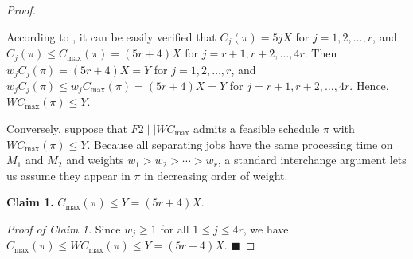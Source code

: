 \documentclass[12pt]{article}
\renewcommand{\thefigure}{\arabic{figure}}
\begin{document}
\begin{sloppypar}
\begin{proof}
\begin{figure}[H]
                \label{fig:nphard-3-partition}
            \end{figure}   
            
            According to , it can be easily verified that $C_j(\pi)=5jX$ for $j=1, 2, \ldots, r$, and $C_j(\pi) \leq C_{\max}(\pi)=(5r+4)X$ for $j=r+1, r+2, \ldots, 4r$. Then $w_j C_j(\pi)=(5r+4)X=Y$ for $j=1, 2, \ldots, r$, and $w_j C_j(\pi) \leq w_j C_{\max}(\pi)=(5r+4)X=Y$ for $j=r+1, r+2, \ldots, 4r$.      
            Hence, $W C_{\max}(\pi) \leq Y$.
            
            Conversely, suppose that $F2 \mid \mid W C_{\max}$ admits a feasible schedule $\pi$ with $W C_{\max}(\pi) \leq Y$. Because all separating jobs have the same processing time on $M_1$ and $M_2$ and weights $w_1 >w_2 > \cdots > w_r$, a standard interchange argument lets us assume they appear in $\pi$ in decreasing order of weight. 
            
            \textbf{Claim 1.} $C_{\max}(\pi) \leq Y=(5r+4)X$.
            
            \textit{Proof of Claim 1.}  Since $w_j \geq 1$ for all $1 \leq j \leq 4r$, we have $C_{\max}(\pi) \leq WC_{\max}(\pi) \leq Y=(5r+4)X$. \hfill$\blacksquare$
            

\end{proof}
\end{sloppypar}
\end{document}
